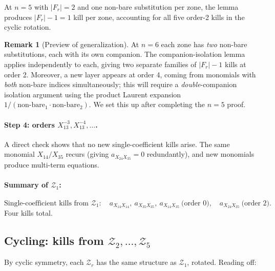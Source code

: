 \documentclass[11pt]{article}
\newcommand{\X}[2]{X_{#1#2}}
\newcommand{\Z}{\mathcal{Z}}
\theoremstyle{definition}
\newtheorem*{remark}{Remark}
\begin{document}
At $n=5$ with $|F_r|=2$ and one non-bare substitution per zone, the lemma
produces $|F_r|-1=1$ kill per zone, accounting for all five order-2 kills
in the cyclic rotation.

\medskip

\begin{remark}[Preview of generalization]
At $n=6$ each zone has \emph{two} non-bare substitutions, each with its own
companion. The companion-isolation lemma applies independently to each,
giving two separate families of $|F_r|-1$ kills at order 2.
Moreover, a new layer appears at order 4, coming from monomials with
\emph{both} non-bare indices simultaneously; this will require a
\emph{double}-companion isolation argument using the product Laurent
expansion $1/(\text{non-bare}_1\cdot\text{non-bare}_2)$. We set this up
after completing the $n=5$ proof.
\end{remark}

\paragraph{Step 4: orders $\X{1}{3}^{-3}, \X{1}{3}^{-4}, \ldots$.}

A direct check shows that no new single-coefficient kills arise. The same
monomial $\X{1}{4}/\X{3}{5}$ recurs (giving $a_{\X{2}{4}\X{3}{5}}=0$
redundantly), and new monomials produce multi-term equations.

\paragraph{Summary of $\Z_1$:}
\[
\text{Single-coefficient kills from }\Z_1:\quad
\boxed{a_{\X{1}{4}\X{1}{4}},\ a_{\X{3}{5}\X{3}{5}},\ a_{\X{1}{4}\X{3}{5}}}\ \text{(order 0)},\quad
\boxed{a_{\X{2}{4}\X{3}{5}}}\ \text{(order 2)}.
\]
Four kills total.

\subsection{Cycling: kills from \texorpdfstring{$\Z_2,\ldots,\Z_5$}{Z2..Z5}}

By cyclic symmetry, each $\Z_r$ has the same structure as $\Z_1$, rotated.
Reading off:
\end{document}
